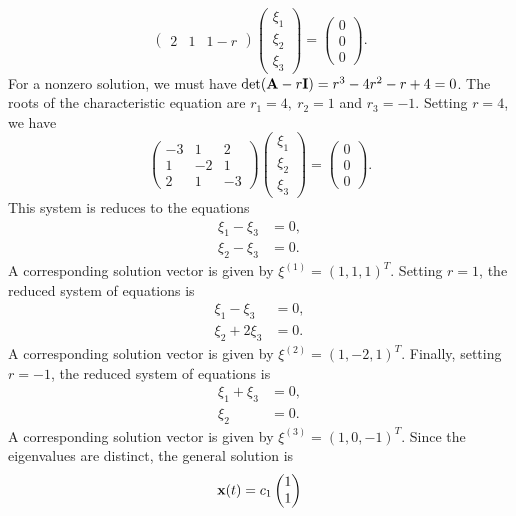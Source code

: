 \documentclass[11pt,a4paper]{article}
\begin{document}
\begin{enumerate}
$$\begin{pmatrix}
			2 & 1 & 1-r
		\end{pmatrix}
		\begin{pmatrix}
			\xi_1\\
			\xi_2\\
			\xi_3
		\end{pmatrix} =
		\begin{pmatrix}
			0\\
			0\\
			0
		\end{pmatrix}.
		$$
		For a nonzero solution, we must have $\det(\vb{A} - r\vb{I}) = r^3 - 4r^2 - r + 4 = 0$. The roots of the characteristic equation are $r_1 = 4,\ r_2 = 1$ and $r_3 = −1$. Setting $r = 4$, we have
		$$
		\begin{pmatrix}
			-3 & 1 & 2\\
			1 & -2 & 1\\
			2 & 1 & -3
		\end{pmatrix}
		\begin{pmatrix}
			\xi_1\\
			\xi_2\\
			\xi_3
		\end{pmatrix}=
		\begin{pmatrix}
			0\\
			0\\
			0
		\end{pmatrix}.
		$$
		This system is reduces to the equations
		\begin{align*}
			\xi_1 - \xi_3 &= 0,\\
			\xi_2 - \xi_3 &= 0.
		\end{align*}
		A corresponding solution vector is given by $\xi^{(1)} = (1, 1, 1)^T$. Setting $r = 1$, the reduced system of equations is
		\begin{align*}
			\xi_1 - \xi_3 &= 0,\\
			\xi_2 + 2\xi_3 &= 0.
		\end{align*}
		A corresponding solution vector is given by $\xi^{(2)} = (1, −2, 1)^T$. Finally, setting $r = -1$, the reduced system of equations is
		\begin{align*}
			\xi_1 + \xi_3 &= 0,\\
			\xi_2 &= 0.
		\end{align*}
		A corresponding solution vector is given by $\xi^{(3)} = (1, 0, −1)^T$. Since the eigenvalues are distinct, the general solution is
		$$
		\vb{x}(t) = c_1
		\begin{pmatrix}
			1\\
			1\\

\end{pmatrix}$$
\end{enumerate}
\end{document}
